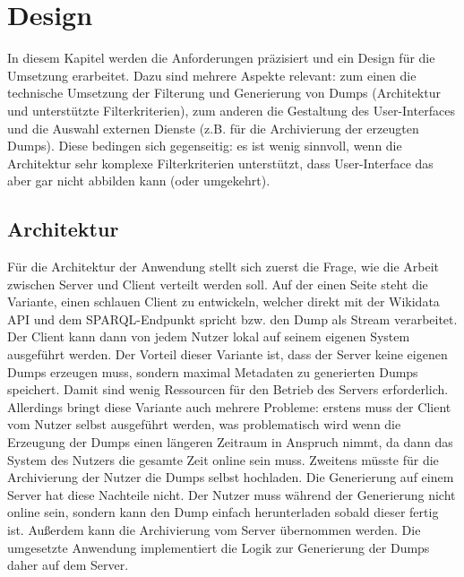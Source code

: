 \chapter{Design}
\label{chap:design}
In diesem Kapitel werden die Anforderungen präzisiert und ein Design für die Umsetzung erarbeitet.
Dazu sind mehrere Aspekte relevant: zum einen die technische Umsetzung der Filterung und Generierung von Dumps (Architektur und unterstützte Filterkriterien), zum anderen die Gestaltung des User-Interfaces und die Auswahl externen Dienste (z.B. für die Archivierung der erzeugten Dumps).
Diese bedingen sich gegenseitig: es ist wenig sinnvoll, wenn die Architektur sehr komplexe Filterkriterien unterstützt, dass User-Interface das aber gar nicht abbilden kann (oder umgekehrt).

\section{Architektur}
Für die Architektur der Anwendung stellt sich zuerst die Frage, wie die Arbeit zwischen Server und Client verteilt werden soll.
Auf der einen Seite steht die Variante, einen schlauen Client zu entwickeln, welcher direkt mit der Wikidata API und dem SPARQL-Endpunkt spricht bzw. den Dump als Stream verarbeitet.
Der Client kann dann von jedem Nutzer lokal auf seinem eigenen System ausgeführt werden.
Der Vorteil dieser Variante ist, dass der Server keine eigenen Dumps erzeugen muss, sondern maximal Metadaten zu generierten Dumps speichert.
Damit sind wenig Ressourcen für den Betrieb des Servers erforderlich.
Allerdings bringt diese Variante auch mehrere Probleme: erstens muss der Client vom Nutzer selbst ausgeführt werden, was problematisch wird wenn die Erzeugung der Dumps einen längeren Zeitraum in Anspruch nimmt, da dann das System des Nutzers die gesamte Zeit online sein muss.
Zweitens müsste für die Archivierung der Nutzer die Dumps selbst hochladen.
Die Generierung auf einem Server hat diese Nachteile nicht.
Der Nutzer muss während der Generierung nicht online sein, sondern kann den Dump einfach herunterladen sobald dieser fertig ist.
Außerdem kann die Archivierung vom Server übernommen werden.
Die umgesetzte Anwendung implementiert die Logik zur Generierung der Dumps daher auf dem Server.

